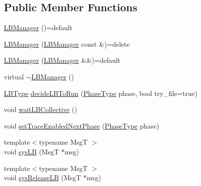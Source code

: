 \subsection*{Public Member Functions}
\begin{DoxyCompactItemize}
\item 
\hyperlink{structvt_1_1vrt_1_1collection_1_1balance_1_1_l_b_manager_a4adad6931af7d5ff2cb983859ed939f3}{L\+B\+Manager} ()=default
\item 
\hyperlink{structvt_1_1vrt_1_1collection_1_1balance_1_1_l_b_manager_af361eb6d3fa35d04873fcbe74b315d4a}{L\+B\+Manager} (\hyperlink{structvt_1_1vrt_1_1collection_1_1balance_1_1_l_b_manager}{L\+B\+Manager} const \&)=delete
\item 
\hyperlink{structvt_1_1vrt_1_1collection_1_1balance_1_1_l_b_manager_ab5efdf949166922f70cb49d171bf509a}{L\+B\+Manager} (\hyperlink{structvt_1_1vrt_1_1collection_1_1balance_1_1_l_b_manager}{L\+B\+Manager} \&\&)=default
\item 
virtual \hyperlink{structvt_1_1vrt_1_1collection_1_1balance_1_1_l_b_manager_a1b2c452667a70cbd1287969c32f538f1}{$\sim$\+L\+B\+Manager} ()
\item 
\hyperlink{namespacevt_1_1vrt_1_1collection_1_1balance_ac4f99693509affcc67db182d4aad9b5c}{L\+B\+Type} \hyperlink{structvt_1_1vrt_1_1collection_1_1balance_1_1_l_b_manager_a6c610e1c053f986932d8a59bb89eb37d}{decide\+L\+B\+To\+Run} (\hyperlink{namespacevt_a46ce6733d5cdbd735d561b7b4029f6d7}{Phase\+Type} phase, bool try\+\_\+file=true)
\item 
void \hyperlink{structvt_1_1vrt_1_1collection_1_1balance_1_1_l_b_manager_a2923d77f512a955194589450cbb85b80}{wait\+L\+B\+Collective} ()
\item 
void \hyperlink{structvt_1_1vrt_1_1collection_1_1balance_1_1_l_b_manager_abb0411627a6282d0c08dd1c6b42046f7}{set\+Trace\+Enabled\+Next\+Phase} (\hyperlink{namespacevt_a46ce6733d5cdbd735d561b7b4029f6d7}{Phase\+Type} phase)
\item 
{\footnotesize template$<$typename MsgT $>$ }\\void \hyperlink{structvt_1_1vrt_1_1collection_1_1balance_1_1_l_b_manager_a5a3a3a1c74201981c2d62b85c2e84006}{sys\+LB} (MsgT $\ast$msg)
\item 
{\footnotesize template$<$typename MsgT $>$ }\\void \hyperlink{structvt_1_1vrt_1_1collection_1_1balance_1_1_l_b_manager_a50a782417c408ce3c33e7d70ebcd5d2e}{sys\+Release\+LB} (MsgT $\ast$msg)
\end{DoxyCompactItemize}
